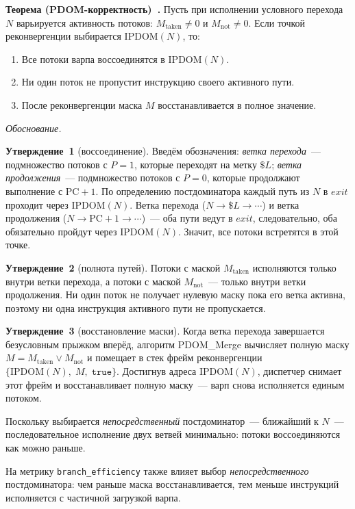 \textbf{Теорема (PDOM-корректность)~\cite{Fung2007, BenSalem2016}.}
Пусть при исполнении условного перехода $N$ варьируется
активность потоков: $M_{\mathrm{taken}} \neq 0$ и
$M_{\mathrm{not}} \neq 0$. Если точкой реконвергенции выбирается
$\mathrm{IPDOM}(N)$, то:
\begin{enumerate}
  \item Все потоки варпа воссоединятся в $\mathrm{IPDOM}(N)$.
  \item Ни один поток не пропустит инструкцию своего активного пути.
  \item После реконвергенции маска $M$ восстанавливается в полное значение.
\end{enumerate}

\textit{Обоснование.}

\textbf{Утверждение~1} (воссоединение).
Введём обозначения: \textit{ветка перехода}~--- подмножество потоков
с $P=1$, которые переходят на метку $\$L$; \textit{ветка продолжения}~---
подмножество потоков с $P=0$, которые продолжают выполнение с $\mathrm{PC}+1$.
По определению постдоминатора каждый путь из $N$ в $\mathit{exit}$
проходит через $\mathrm{IPDOM}(N)$.
Ветка перехода ($N \to \$L \to \cdots$) и ветка продолжения
($N \to \mathrm{PC}+1 \to \cdots$)~--- оба пути ведут в
$\mathit{exit}$, следовательно, оба обязательно пройдут через
$\mathrm{IPDOM}(N)$. Значит, все потоки встретятся в этой точке.

\textbf{Утверждение~2} (полнота путей). Потоки с маской $M_{\mathrm{taken}}$
исполняются только внутри ветки перехода, а потоки с маской
$M_{\mathrm{not}}$~--- только внутри ветки продолжения.
Ни один поток не получает нулевую маску пока его ветка активна,
поэтому ни одна инструкция активного пути не пропускается.

\textbf{Утверждение~3} (восстановление маски). Когда ветка перехода
завершается безусловным прыжком вперёд, алгоритм PDOM\_Merge вычисляет
полную маску $M = M_{\mathrm{taken}} \vee M_{\mathrm{not}}$ и помещает
в стек фрейм реконвергенции $\{\mathrm{IPDOM}(N),\;M,\;\texttt{true}\}$.
Достигнув адреса $\mathrm{IPDOM}(N)$, диспетчер снимает этот фрейм
и восстанавливает полную маску~--- варп снова исполняется единым потоком.

Поскольку выбирается \textit{непосредственный} постдоминатор~---
ближайший к $N$~--- последовательное исполнение двух ветвей
минимально: потоки воссоединяются как можно раньше.

На метрику \texttt{branch\_efficiency} также влияет выбор
\textit{непосредственного} постдоминатора: чем раньше
маска восстанавливается, тем меньше инструкций исполняется
с частичной загрузкой варпа.

